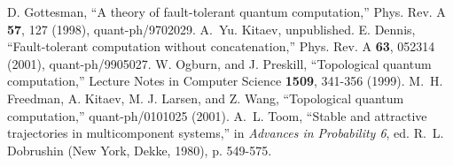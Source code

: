 \begin{references}
 D. Gottesman, ``A theory of fault-tolerant quantum computation,'' Phys. Rev. A {\bf 57}, 127 (1998), quant-ph/9702029.
 A.~Yu. Kitaev, unpublished.
 E. Dennis, ``Fault-tolerant computation without concatenation,'' Phys. Rev. A {\bf 63}, 052314 (2001), quant-ph/9905027.
 W. Ogburn, and J. Preskill, ``Topological quantum computation,''  Lecture Notes in Computer Science {\bf 1509}, 341-356 (1999). 
  M.~H. Freedman, A. Kitaev, M. J. Larsen, and Z. Wang, ``Topological quantum computation,'' quant-ph/0101025 (2001).
 A.~L. Toom, ``Stable and attractive trajectories in multicomponent systems,'' in {\it Advances in Probability 6}, ed. R.~L. Dobrushin (New York, Dekke, 1980), p. 549-575.

\end{references}

